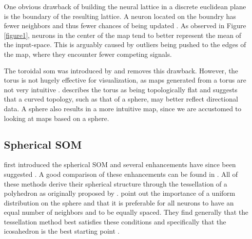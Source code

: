\documentclass[11pt]{article}
\begin{document}
One obvious drawback of building the neural lattice in a discrete euclidean
plane is the boundary of the resulting lattice.  A neuron located on the boundry
has fewer neighbors and thus fewer chances of being updated \citep{wu2006}.  As
observed in Figure \ref{figure1}, neurons in the center of the map tend to
better represent the mean of the input-space.  This is arguably caused by
outliers being pushed to the edges of the map, where they encounter fewer
competing signals.

The toroidal som was introduced by \cite{li1993} and removes this drawback.
However, the torus is not hugely effective for visualization, as maps generated
from a torus are not very intuitive \citep{ito2000,wu2006}.  \cite{ritter99}
describes the torus as being topologically flat and suggests that a curved
topology, such as that of a sphere, may better reflect directional data.  A
sphere also results in a more intuitive map, since we are accustomed to looking
at maps based on a sphere.

\subsection{Spherical SOM}
\cite{ritter99} first introduced the spherical SOM and several enhancements have
since been suggested \citep{boudjemai2003,sangole03,Nishio:2006fk,wu2006}.  A
good comparison of these enhancements can be found in \citep{wu2006}.  All of
these methods derive their spherical structure through the tessellation of a
polyhedron as originally proposed by \citeauthor{ritter99}.  \cite{wu2006} point
out the importance of a uniform distribution on the sphere and that it is
preferable for all neurons to have an equal number of neighbors and to be
equally spaced.  They find generally that the tessellation method best satisfies
these conditions and specifically that the icosahedron is the best starting
point \citep{wu2005}.
\end{document}
